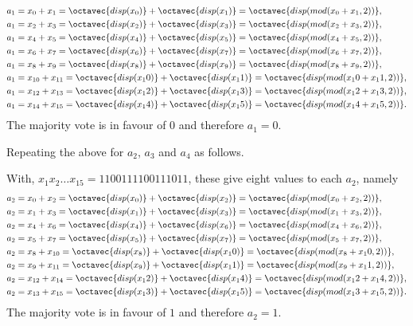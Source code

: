 \begin{enumerate}[label=(\roman*)]
\begin{align*}
	a_1 &= x_0 + x_1
	= \octavec{disp(x_0)}+ \octavec{disp(x_1)} = \octavec{disp(mod(x_0+x_1,2))},\\
	a_1 &= x_2 + x_3
	= \octavec{disp(x_2)}+ \octavec{disp(x_3)} = \octavec{disp(mod(x_2+x_3,2))},\\
	a_1 &= x_4 + x_5
	= \octavec{disp(x_4)}+ \octavec{disp(x_5)} = \octavec{disp(mod(x_4+x_5,2))},\\
	a_1 &= x_6 + x_7
	= \octavec{disp(x_6)}+ \octavec{disp(x_7)} = \octavec{disp(mod(x_6+x_7,2))},\\
	a_1 &= x_8 + x_9
	= \octavec{disp(x_8)}+ \octavec{disp(x_9)} = \octavec{disp(mod(x_8+x_9,2))},\\
	a_1 &= x_{10} + x_{11}
	= \octavec{disp(x_10)}+ \octavec{disp(x_11)} = \octavec{disp(mod(x_10+x_11,2))},\\
	a_1 &= x_{12} + x_{13}
	= \octavec{disp(x_12)}+ \octavec{disp(x_13)} = \octavec{disp(mod(x_12+x_13,2))},\\
	a_1 &= x_{14} + x_{15}
	= \octavec{disp(x_14)}+ \octavec{disp(x_15)} = \octavec{disp(mod(x_14+x_15,2))}.
\end{align*}
The majority vote is in favour of $0$ and therefore $a_1 = 0$.  

Repeating the above for $a_2$, $a_3$ and $a_4$ as follows.

With, $x_1x_2\ldots x_{15}=1100111100111011$, these give eight values to each $a_2$, namely
\begin{align*}
	a_2 &= x_0 + x_2
	= \octavec{disp(x_0)}+ \octavec{disp(x_2)} = \octavec{disp(mod(x_0+x_2,2))},\\
	a_2 &= x_1 + x_3
	= \octavec{disp(x_1)}+ \octavec{disp(x_3)} = \octavec{disp(mod(x_1+x_3,2))},\\
	a_2 &= x_4 + x_6
	= \octavec{disp(x_4)}+ \octavec{disp(x_6)} = \octavec{disp(mod(x_4+x_6,2))},\\
	a_2 &= x_5 + x_7
	= \octavec{disp(x_5)}+ \octavec{disp(x_7)} = \octavec{disp(mod(x_5+x_7,2))},\\
	a_2 &= x_8 + x_{10}
	= \octavec{disp(x_8)}+ \octavec{disp(x_10)} = \octavec{disp(mod(x_8+x_10,2))},\\
	a_2 &= x_{9} + x_{11}
	= \octavec{disp(x_9)}+ \octavec{disp(x_11)} = \octavec{disp(mod(x_9+x_11,2))},\\
	a_2 &= x_{12} + x_{14}
	= \octavec{disp(x_12)}+ \octavec{disp(x_14)} = \octavec{disp(mod(x_12+x_14,2))},\\
	a_2 &= x_{13} + x_{15}
	= \octavec{disp(x_13)}+ \octavec{disp(x_15)} = \octavec{disp(mod(x_13+x_15,2))}.
\end{align*}
The majority vote is in favour of $1$ and therefore $a_2 = 1$.


\end{enumerate}
